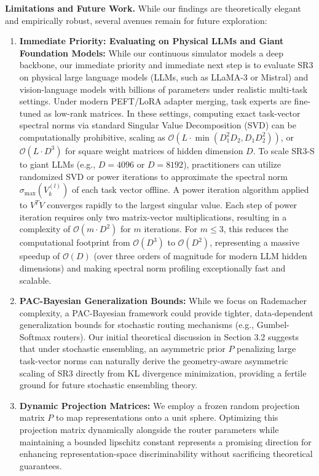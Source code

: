 \textbf{Limitations and Future Work.}
While our findings are theoretically elegant and empirically robust, several avenues remain for future exploration:
\begin{enumerate}
    \item \textbf{Immediate Priority: Evaluating on Physical LLMs and Giant Foundation Models:} While our continuous simulator models a deep backbone, our immediate priority and immediate next step is to evaluate SR3 on physical large language models (LLMs, such as LLaMA-3 or Mistral) and vision-language models with billions of parameters under realistic multi-task settings. Under modern PEFT/LoRA adapter merging, task experts are fine-tuned as low-rank matrices. In these settings, computing exact task-vector spectral norms via standard Singular Value Decomposition (SVD) can be computationally prohibitive, scaling as $\mathcal{O}(L \cdot \min(D_1^2 D_2, D_1 D_2^2))$, or $\mathcal{O}(L \cdot D^3)$ for square weight matrices of hidden dimension $D$. To scale SR3-S to giant LLMs (e.g., $D = 4096$ or $D=8192$), practitioners can utilize randomized SVD or power iterations to approximate the spectral norm $\sigma_{\max}(V_k^{(l)})$ of each task vector offline. A power iteration algorithm applied to $V^T V$ converges rapidly to the largest singular value. Each step of power iteration requires only two matrix-vector multiplications, resulting in a complexity of $\mathcal{O}(m \cdot D^2)$ for $m$ iterations. For $m \le 3$, this reduces the computational footprint from $\mathcal{O}(D^3)$ to $\mathcal{O}(D^2)$, representing a massive speedup of $\mathcal{O}(D)$ (over three orders of magnitude for modern LLM hidden dimensions) and making spectral norm profiling exceptionally fast and scalable.
    \item \textbf{PAC-Bayesian Generalization Bounds:} While we focus on Rademacher complexity, a PAC-Bayesian framework could provide tighter, data-dependent generalization bounds for stochastic routing mechanisms (e.g., Gumbel-Softmax routers). Our initial theoretical discussion in Section 3.2 suggests that under stochastic ensembling, an asymmetric prior $P$ penalizing large task-vector norms can naturally derive the geometry-aware asymmetric scaling of SR3 directly from KL divergence minimization, providing a fertile ground for future stochastic ensembling theory.
    \item \textbf{Dynamic Projection Matrices:} We employ a frozen random projection matrix $P$ to map representations onto a unit sphere. Optimizing this projection matrix dynamically alongside the router parameters while maintaining a bounded lipschitz constant represents a promising direction for enhancing representation-space discriminability without sacrificing theoretical guarantees.

\end{enumerate}
